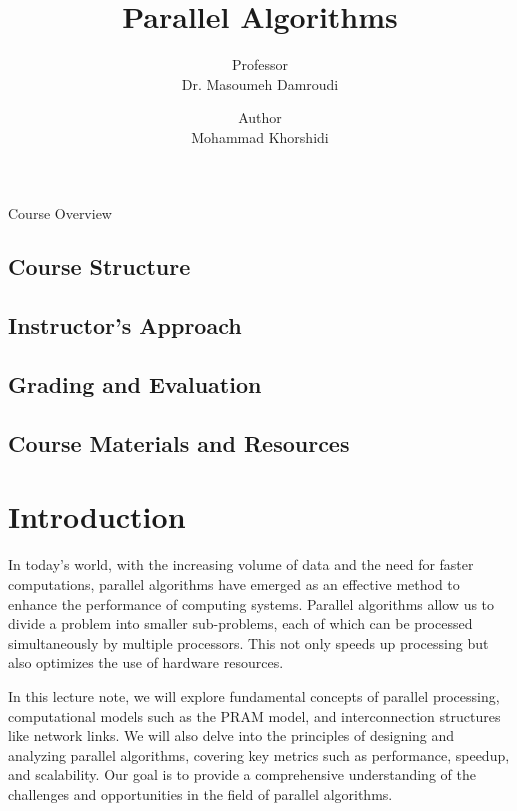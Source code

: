 \documentclass[a4paper, 10pt]{book}
\title{\huge {\bold Parallel Algorithms}}
\author{Professor\\{\bold Dr. Masoumeh Damroudi}}
\date{Author\\{\bold Mohammad Khorshidi}}
\begin{document}
    \maketitle
    \newpage

    \begin{center}
        \Large {\bold Course Overview}
    \end{center}

    \section{Course Structure}

    \section{Instructor's Approach}

    \section{Grading and Evaluation}

    \section{Course Materials and Resources}

    \tableofcontents
    
    \chapter{{\bold Introduction}}


        In today’s world, with the increasing volume of data and the need for faster computations, parallel algorithms have emerged as an effective method to enhance the performance of computing systems. Parallel algorithms allow us to divide a problem into smaller sub-problems, each of which can be processed simultaneously by multiple processors. This not only speeds up processing but also optimizes the use of hardware resources.

        In this lecture note, we will explore fundamental concepts of parallel processing, computational models such as the PRAM model, and interconnection structures like network links. We will also delve into the principles of designing and analyzing parallel algorithms, covering key metrics such as performance, speedup, and scalability. Our goal is to provide a comprehensive understanding of the challenges and opportunities in the field of parallel algorithms.
\end{document}

